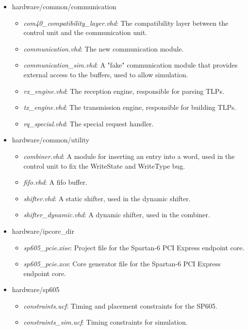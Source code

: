 \begin{itemize}
    \item hardware/common/communication
    \begin{itemize}
        \item \emph{com40\_compatibility\_layer.vhd}: The compatibility layer between the control unit and the communication unit.
        \item \emph{communication.vhd}: The new communication module.
        \item \emph{communication\_sim.vhd}: A "fake" communication module that provides external access to the buffers, used to allow simulation.
        \item \emph{rx\_engine.vhd}: The reception engine, responsible for parsing TLPs.
        \item \emph{tx\_engine.vhd}: The transmission engine, responsible for building TLPs.
        \item \emph{rq\_special.vhd}: The special request handler.
    \end{itemize}
    \item hardware/common/utility
    \begin{itemize}
        \item \emph{combiner.vhd}: A module for inserting an entry into a word, used in the control unit to fix the WriteState and WriteType bug.
        \item \emph{fifo.vhd}: A fifo buffer.
        \item \emph{shifter.vhd}: A static shifter, used in the dynamic shifter.
        \item \emph{shifter\_dynamic.vhd}: A dynamic shifter, used in the combiner.
    \end{itemize}
    \item hardware/ipcore\_dir
    \begin{itemize}
        \item \emph{sp605\_pcie.xise}: Project file for the Spartan-6 PCI Express endpoint core.
        \item \emph{sp605\_pcie.xco}: Core generator file for the Spartan-6 PCI Express endpoint core.
    \end{itemize}
    \item hardware/sp605
    \begin{itemize}
        \item \emph{constraints.ucf}: Timing and placement constraints for the SP605.
        \item \emph{constraints\_sim.ucf}: Timing constraints for simulation.

\end{itemize}
\end{itemize}
